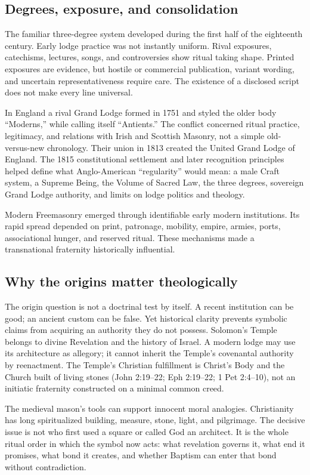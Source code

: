 \subsection{Degrees, exposure, and consolidation}

The familiar three-degree system developed during the first half of the eighteenth century. Early lodge practice was not instantly uniform. Rival exposures, catechisms, lectures, songs, and controversies show ritual taking shape. Printed exposures are evidence, but hostile or commercial publication, variant wording, and uncertain representativeness require care. The existence of a disclosed script does not make every line universal.

In England a rival Grand Lodge formed in 1751 and styled the older body “Moderns,” while calling itself “Antients.” The conflict concerned ritual practice, legitimacy, and relations with Irish and Scottish Masonry, not a simple old-versus-new chronology. Their union in 1813 created the United Grand Lodge of England. The 1815 constitutional settlement and later recognition principles helped define what Anglo-American “regularity” would mean: a male Craft system, a Supreme Being, the Volume of Sacred Law, the three degrees, sovereign Grand Lodge authority, and limits on lodge politics and theology.

Modern Freemasonry emerged through identifiable early modern institutions. Its rapid spread depended on print, patronage, mobility, empire, armies, ports, associational hunger, and reserved ritual. These mechanisms made a transnational fraternity historically influential.

\subsection{Why the origins matter theologically}

The origin question is not a doctrinal test by itself. A recent institution can be good; an ancient custom can be false. Yet historical clarity prevents symbolic claims from acquiring an authority they do not possess. Solomon's Temple belongs to divine Revelation and the history of Israel. A modern lodge may use its architecture as allegory; it cannot inherit the Temple's covenantal authority by reenactment. The Temple's Christian fulfillment is Christ's Body and the Church built of living stones (John 2:19--22; Eph 2:19--22; 1 Pet 2:4--10), not an initiatic fraternity constructed on a minimal common creed.

The medieval mason's tools can support innocent moral analogies. Christianity has long spiritualized building, measure, stone, light, and pilgrimage. The decisive issue is not who first used a square or called God an architect. It is the whole ritual order in which the symbol now acts: what revelation governs it, what end it promises, what bond it creates, and whether Baptism can enter that bond without contradiction.
